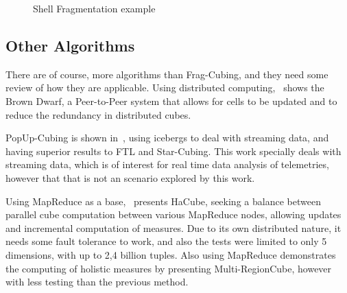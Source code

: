 \begin{figure}[!htb]
  \caption{Shell Fragmentation example}\label{fig:hasseexample}
  \vspace{2mm}
  \begin{center}
  \end{center}
  \vspace{1mm}
  \legenda{}
\end{figure}

\subsection{Other Algorithms}\label{ch:corr:cube:others}

There are of course, more algorithms than Frag-Cubing, and they need some review of how they are applicable.
Using distributed computing,~ shows the Brown Dwarf, a Peer-to-Peer system that allows for cells to be updated and to reduce the redundancy in distributed cubes.

PopUp-Cubing is shown in~, using icebergs to deal with streaming data, and having superior results to FTL and Star-Cubing.
This work specially deals with streaming data, which is of interest for real time data analysis of telemetries, however that that is not an scenario explored by this work.

Using MapReduce as a base,~ presents HaCube, seeking a balance between parallel cube computation between various MapReduce nodes, allowing updates and incremental computation of measures.
Due to its own distributed nature, it needs some fault tolerance to work, and also the tests were limited to only 5 dimensions, with up to 2,4 billion tuples.
Also using MapReduce  demonstrates the computing of holistic measures by presenting Multi-RegionCube, however with less testing than the previous method.

